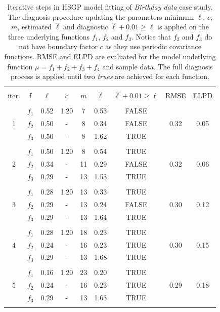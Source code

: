 \begin{table}
\centering
\setlength{\tabcolsep}{4pt}
\begin{tabular}{ccccccccc}
\arrayrulecolor{gray}\hline \\[-3mm]
iter. & f & $\ell$ & $c$ & $m$ & $\hat{\ell}$ & $\hat{\ell} + 0.01 \geq \ell$ & RMSE & ELPD \\ 
\arrayrulecolor{lightgray}\hline \\[-2mm]
   & $f_1$ & 0.52 & 1.20 & 7  & 0.53 & FALSE &      &  	   \\
 1 & $f_2$ & 0.50 & -    & 8  & 0.34 & FALSE & 0.32 & 0.05 \\
   & $f_3$ & 0.50 & -    & 8  & 1.62 & TRUE  &      &  	   \\
\arrayrulecolor{lightgray}\hline \\[-2mm]
   & $f_1$ & 0.50 & 1.20 & 8  & 0.54 & TRUE  &      &  	   \\
 2 & $f_2$ & 0.34 & -    & 11 & 0.29 & FALSE & 0.32 & 0.06 \\
   & $f_3$ & 0.29 & -    & 13 & 1.53 & TRUE  &      &  	   \\
\arrayrulecolor{lightgray}\hline \\[-2mm]
   & $f_1$ & 0.28 & 1.20 & 13 & 0.33 & TRUE  &      &  	   \\
 3 & $f_2$ & 0.29 & -    & 13 & 0.24 & FALSE & 0.30 & 0.12 \\
   & $f_3$ & 0.29 & -    & 13 & 1.64 & TRUE  &      &  	   \\
\arrayrulecolor{lightgray}\hline \\[-2mm]
   & $f_1$ & 0.28 & 1.20 & 18 & 0.23 & TRUE  &      &  	   \\
 4 & $f_2$ & 0.24 & -    & 16 & 0.23 & TRUE  & 0.30 & 0.15 \\
   & $f_3$ & 0.29 & -    & 13 & 1.68 & TRUE  &      &  	   \\
\arrayrulecolor{lightgray}\hline \\[-2mm]
   & $f_1$ & 0.16 & 1.20 & 23 & 0.20 & TRUE  &      &  	   \\
 5 & $f_2$ & 0.24 & -    & 16 & 0.23 & TRUE  & 0.29 & 0.18 \\
   & $f_3$ & 0.29 & -    & 13 & 1.63 & TRUE  &      &  	   \\[1mm]
\arrayrulecolor{gray}\hline
\end{tabular}
\caption{Iterative steps in HSGP model fitting of \textit{Birthday data} case study. The diagnosis procedure updating the parameters minimum $\ell$, $c$, $m$, estimated $\hat{\ell}$ and diagnostic $\hat{\ell} + 0.01 \geq \ell$ is applied on the three underlying functions $f_1$, $f_2$ and $f_3$. Notice that $f_2$ and $f_3$ do not have boundary factor $c$ as they use periodic covariance functions. RMSE and ELPD are evaluated for the model underlying function $\mu=f_1 + f_2 + f_3 + f_4$ and sample data. The full diagnosis process is applied until two \textit{trues} are achieved for each function.}
  \label{tab_caseII}
\end{table}

